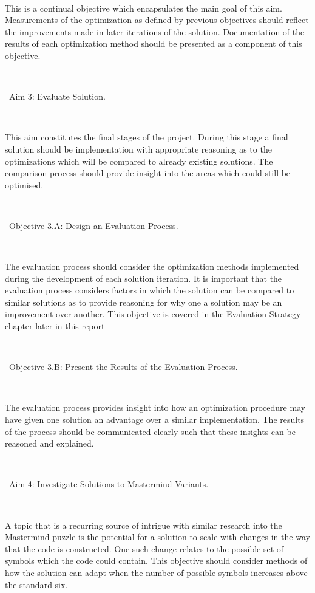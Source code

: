 \documentclass[12pt]{article}  %
\theoremstyle{definition}
\theoremstyle{remark}
\begin{document}
\

This is a continual objective which encapsulates the main goal of this aim. Measurements of the optimization as defined by previous 
objectives should reflect the improvements made in later iterations of the solution. Documentation of the results of each optimization 
method should be presented as a component of this objective.

\

\textbullet\ Aim 3: Evaluate Solution.

\

This aim constitutes the final stages of the project. During this stage a final solution should be implementation with appropriate reasoning 
as to the optimizations which will be compared to already existing solutions. The comparison process should provide insight into the 
areas which could still be optimised.

\

\textbullet\ Objective 3.A: Design an Evaluation Process.

\

The evaluation process should consider the optimization methods implemented during the development of each solution iteration. It is important
that the evaluation process considers factors in which the solution can be compared to similar solutions as to provide reasoning for why one
a solution may be an improvement over another. This objective is covered in the Evaluation Strategy chapter later in this report


\

\textbullet\ Objective 3.B: Present the Results of the Evaluation Process.

\

The evaluation process provides insight into how an optimization procedure may have given one solution an advantage over a similar implementation.
The results of the process should be communicated clearly such that these insights can be reasoned and explained.

\

\textbullet\ Aim 4: Investigate Solutions to Mastermind Variants.

\

A topic that is a recurring source of intrigue with similar research into the Mastermind puzzle is the potential for a solution to scale with
changes in the way that the code is constructed. One such change relates to the possible set of symbols which the code could contain.
This objective should consider methods of how the solution can adapt when the number of possible symbols increases above the standard six.
\end{document}
